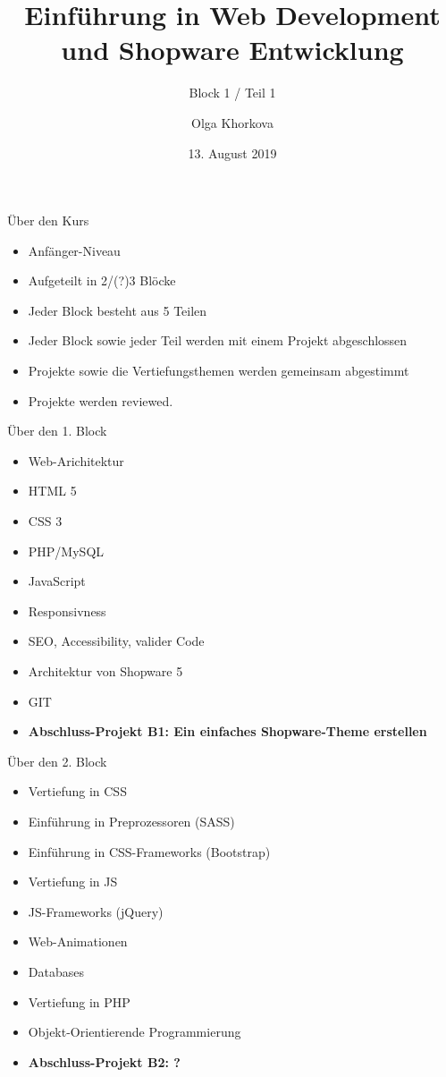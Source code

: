\documentclass[12pt,xcolor={rgb}]{beamer}
\begin{document}
\title[Einführung in WebDev B1/T1]{Einführung in Web Development und Shopware Entwicklung}

\subtitle{Block 1 / Teil 1}
\author{Olga Khorkova}

\date{13. August 2019}

\begin{frame}[plain]
\titlepage
\end{frame}


\begin{frame}{Über den Kurs}
\begin{itemize}
\item Anfänger-Niveau
\item Aufgeteilt in 2/(?)3 Blöcke
\item Jeder Block besteht aus 5 Teilen
\item Jeder Block sowie jeder Teil werden mit einem Projekt abgeschlossen 
\item Projekte sowie die Vertiefungsthemen werden gemeinsam abgestimmt
\item Projekte werden reviewed.
\end{itemize}
\end{frame}

\begin{frame}{Über den 1. Block}
\begin{itemize}
\item Web-Arichitektur
\item HTML 5
\item CSS 3
\item PHP/MySQL
\item JavaScript
\item Responsivness
\item SEO, Accessibility, valider Code
\item Architektur von Shopware 5
\item GIT
\item \bf{Abschluss-Projekt B1:} Ein einfaches Shopware-Theme erstellen
\end{itemize}
\end{frame}

\begin{frame}{Über den 2. Block}
\begin{itemize}
\item Vertiefung in CSS
\item Einführung in Preprozessoren (SASS)
\item Einführung in CSS-Frameworks (Bootstrap)
\item Vertiefung in JS
\item JS-Frameworks (jQuery)
\item Web-Animationen
\item Databases
\item Vertiefung in PHP
\item Objekt-Orientierende Programmierung
\item \bf{Abschluss-Projekt B2:} ?
\end{itemize}
\end{frame}
\end{document}
